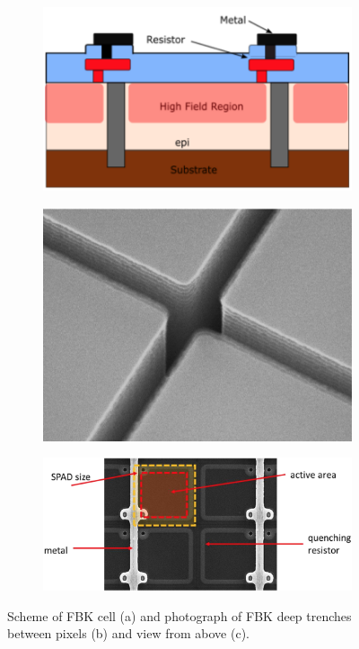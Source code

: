 \begin{figure}[htbp]
  \centering
  \begin{subfigure}[b]{0.48\linewidth}
    \includegraphics[width=1\linewidth]{gfx/schemes/FBK_technology_spad.png}
    \caption{}  
  \end{subfigure}
  \hfill
  \begin{subfigure}[b]{0.48\linewidth}          
    \includegraphics[width=1\linewidth]{gfx/pictures/FBK_trench.png}  
    \caption{}
  \end{subfigure}
  \hfill
  \begin{subfigure}[b]{1\linewidth}          
    \includegraphics[width=1\linewidth]{gfx/pictures/FBK_techpic.png} 
    \caption{}
  \end{subfigure}
    \caption{Scheme of FBK cell (a) and photograph of FBK deep trenches between pixels (b) and view from above (c). \cite{Paternoster2019SiliconPerspectives}}
    \label{fig:fbk tech scheme trench photo}
\end{figure}


